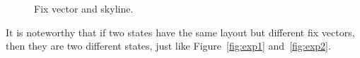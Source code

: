 \documentclass[review,3p,times,12pt,number]{elsarticle}\usepackage{amsmath}\usepackage{amssymb}
\begin{document}
\begin{figure}[htbp]
\centering
{}
\caption{Fix vector and skyline.}
\label{fig:skyline}
\end{figure}


It is noteworthy that if two states have the same layout but different fix vectors, then they are two different states, just like Figure~\ref{fig:exp1} and~\ref{fig:exp2}.
\end{document}

